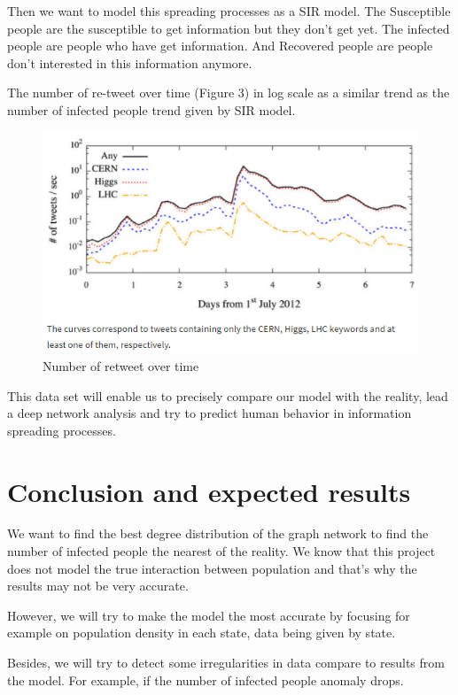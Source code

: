 Then we want to model this spreading processes as a SIR model. The Susceptible people are the susceptible to get information but they don't get yet. The infected people are people who have get information. And Recovered people are people don't interested in this information anymore.

The number of re-tweet over time (Figure 3)\cite{article} in log scale as a similar trend as the number of infected people trend given by SIR model.

\begin{figure}
    \centering
    \includegraphics[scale=0.5]{Capture.PNG}
    \caption{Number of retweet over time}
    \label{fig:my_label}
\end{figure}



This data set will enable us to precisely compare our model with the reality, lead a deep network analysis and try to predict human behavior in information spreading processes.


\section{Conclusion and expected results}

We want to find the best degree distribution of the graph network to find the number of infected people the nearest of the reality.
We know that this project does not model the true interaction between population and that's why the results may not be very accurate.

However, we will try to make the model the most accurate by focusing for example on population density in each state, data being given by state.

Besides, we will try to detect some irregularities in data compare to results from the model. For example, if the number of infected people anomaly drops.








